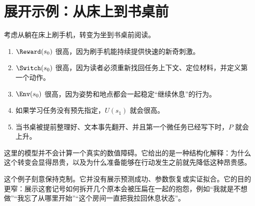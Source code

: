 \section{展开示例：从床上到书桌前}

\begin{example}
考虑从躺在床上刷手机，转变为坐到书桌前阅读。
\begin{enumerate}[nosep]
  \item $\Reward(s_0)$ 很高，因为刷手机能持续提供快速的新奇刺激。
  \item $\Switch(s_0)$ 很高，因为读者必须重新找回任务上下文、定位材料，并定义第一个动作。
  \item $\Env(s_0)$ 很高，因为姿势和地点都会一起稳定“继续休息”的行为。
  \item 如果学习任务没有预先指定，$U(s_1)$ 就会很高。
  \item 当书桌被提前整理好、文本事先翻开、并且第一个微任务已经写下时，$P$ 就会上升。
\end{enumerate}
这里的模型并不会计算一个真实的数值障碍。它给出的是一种结构化解释：为什么这个转变会显得昂贵，以及为什么准备能够在行动发生之前就先降低这种昂贵感。
\end{example}

\begin{discussion}
这个例子刻意保持克制。它并没有展示预测成功、参数恢复或实证拟合。它的目的更窄：展示这套记号如何拆开几个原本会被压扁在一起的抱怨，例如“我就是不想做”“我忘了从哪里开始”“这个房间一直把我拉回休息状态”。
\end{discussion}